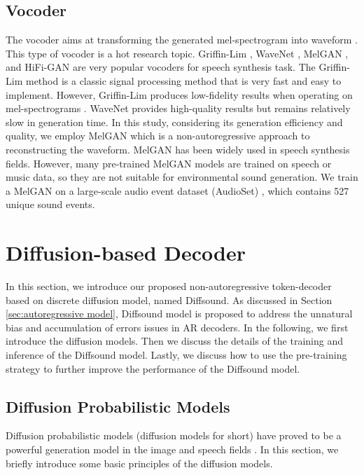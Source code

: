\documentclass[lettersize,journal]{IEEEtran}
\begin{document}
\subsection{Vocoder}
The vocoder aims at transforming the generated mel-spectrogram into waveform . This type of vocoder is a hot research topic. Griffin-Lim \cite{griffin1984signal}, WaveNet \cite{oord2016wavenet}, MelGAN \cite{kumar2019melgan}, and HiFi-GAN \cite{kong2020hifi} are very popular vocoders for speech synthesis task. The Griffin-Lim method is a classic signal processing method that is very fast and easy to implement. However, Griffin-Lim produces low-fidelity results when operating on mel-spectrograms \cite{iashin2021taming}. WaveNet provides high-quality results but remains relatively slow in generation time. In this study, considering its generation efficiency and quality, we employ MelGAN which is a non-autoregressive approach to reconstructing the waveform. MelGAN has been widely used in speech synthesis fields. However, many pre-trained MelGAN models are trained on speech or music data, so they are not suitable for environmental sound generation. We train a MelGAN on a large-scale audio event dataset (AudioSet) \cite{gemmeke2017audio}, which contains 527 unique sound events.
\section{Diffusion-based Decoder} \label{sec:diff-decoder}
In this section, we introduce our proposed non-autoregressive token-decoder based on discrete diffusion model, named Diffsound. As discussed in Section \ref{sec:autoregressive model}, Diffsound model is proposed to address the unnatural bias and accumulation of errors issues in AR decoders. In the following, we first introduce the diffusion models. Then we discuss the details of the training and inference of the Diffsound model. Lastly, we discuss how to use the pre-training strategy to further improve the performance of the Diffsound model.
\subsection{Diffusion Probabilistic Models} \label{sec:dpm}
Diffusion probabilistic models (diffusion models for short) \cite{sohl2015deep} have proved to be a powerful generation model in the image and speech fields \cite{dhariwal2021diffusion,gu2021vector}. In this section, we briefly introduce some basic principles of the diffusion models.
\end{document}
